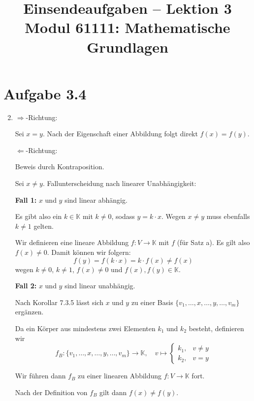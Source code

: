 \documentclass[a4paper,12pt]{article}
\title{Einsendeaufgaben -- Lektion 3\\[0.5em]
\large Modul 61111: Mathematische Grundlagen}
\author{}
\date{}
\begin{document}
\maketitle

\section*{Aufgabe 3.4}

\begin{enumerate}[label=\alph*)]

    \setcounter{enumi}{1}
    \item
    \glqq$\Rightarrow$\grqq-Richtung:

    Sei $x = y$. Nach der Eigenschaft einer Abbildung folgt direkt $f(x) = f(y)$.

    \medskip
    \glqq$\Leftarrow$\grqq-Richtung:

    Beweis durch Kontraposition.

    Sei $x \neq y$. Fallunterscheidung nach linearer Unabhängigkeit:

    \medskip
    \textbf{Fall 1:} $x$ und $y$ sind linear abhängig.

    Es gibt also ein $k \in \mathbb{K}$ mit $k \neq 0$, sodass $y = k \cdot x$. Wegen $x \neq y$ muss ebenfalls $k \neq 1$ gelten.

    Wir definieren eine lineare Abbildung $f: V \to \mathbb{K}$ mit $f$ (für Satz a). Es gilt also $f(x) \neq 0$. Damit können wir folgern:
    \[
        f(y) = f(k \cdot x) = k \cdot f(x) \neq f(x)
    \]
    wegen $k \neq 0$, $k \neq 1$, $f(x) \neq 0$ und $f(x), f(y) \in \mathbb{K}$.

    \medskip
    \textbf{Fall 2:} $x$ und $y$ sind linear unabhängig.

    Nach Korollar 7.3.5 lässt sich $x$ und $y$ zu einer Basis $\{v_1, \ldots, x, \ldots, y, \ldots, v_m\}$ ergänzen.

    Da ein Körper aus mindestens zwei Elementen $k_1$ und $k_2$ besteht, definieren wir
    \[
        f_B \colon \{v_1, \ldots, x, \ldots, y, \ldots, v_m\} \to \mathbb{K}, \quad
        v \mapsto \begin{cases} k_1, & v \neq y \\ k_2, & v = y \end{cases}
    \]

    Wir führen dann $f_B$ zu einer linearen Abbildung $f: V \to \mathbb{K}$ fort.

    Nach der Definition von $f_B$ gilt dann $f(x) \neq f(y)$.


\end{enumerate}
\end{document}
